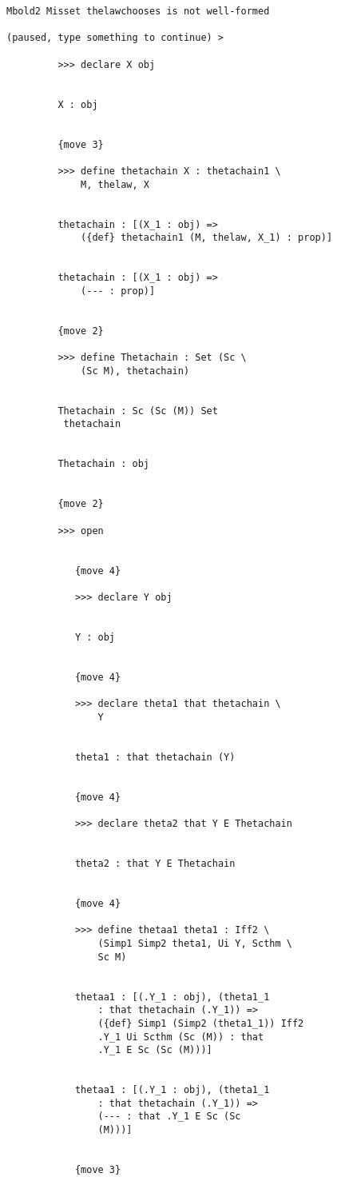 \documentclass[12pt]{article}
\begin{document}
\begin{verbatim}
Mbold2 Misset thelawchooses is not well-formed

(paused, type something to continue) >

         >>> declare X obj


         X : obj


         {move 3}

         >>> define thetachain X : thetachain1 \
             M, thelaw, X


         thetachain : [(X_1 : obj) => 
             ({def} thetachain1 (M, thelaw, X_1) : prop)]


         thetachain : [(X_1 : obj) => 
             (--- : prop)]


         {move 2}

         >>> define Thetachain : Set (Sc \
             (Sc M), thetachain)


         Thetachain : Sc (Sc (M)) Set 
          thetachain


         Thetachain : obj


         {move 2}

         >>> open


            {move 4}

            >>> declare Y obj


            Y : obj


            {move 4}

            >>> declare theta1 that thetachain \
                Y


            theta1 : that thetachain (Y)


            {move 4}

            >>> declare theta2 that Y E Thetachain


            theta2 : that Y E Thetachain


            {move 4}

            >>> define thetaa1 theta1 : Iff2 \
                (Simp1 Simp2 theta1, Ui Y, Scthm \
                Sc M)


            thetaa1 : [(.Y_1 : obj), (theta1_1 
                : that thetachain (.Y_1)) => 
                ({def} Simp1 (Simp2 (theta1_1)) Iff2 
                .Y_1 Ui Scthm (Sc (M)) : that 
                .Y_1 E Sc (Sc (M)))]


            thetaa1 : [(.Y_1 : obj), (theta1_1 
                : that thetachain (.Y_1)) => 
                (--- : that .Y_1 E Sc (Sc 
                (M)))]


            {move 3}


\end{verbatim}
\end{document}
